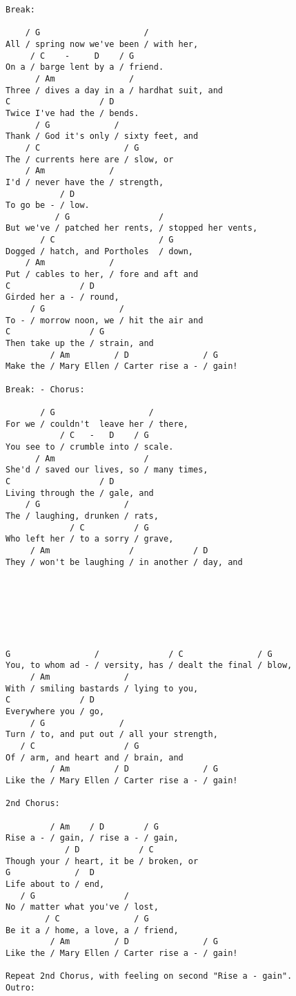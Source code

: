 \documentclass[leqno]{memoir}
\begin{document}
\begin{verbatim}
Break:

    / G                     /
All / spring now we've been / with her,
     / C    -     D    / G
On a / barge lent by a / friend.
      / Am               /
Three / dives a day in a / hardhat suit, and
C                  / D
Twice I've had the / bends.
      / G             /
Thank / God it's only / sixty feet, and
    / C                 / G
The / currents here are / slow, or
    / Am             /
I'd / never have the / strength,
           / D
To go be - / low.
          / G                  /
But we've / patched her rents, / stopped her vents,
       / C                     / G
Dogged / hatch, and Portholes  / down,
    / Am             /
Put / cables to her, / fore and aft and
C              / D
Girded her a - / round,
     / G               /
To - / morrow noon, we / hit the air and
C                / G
Then take up the / strain, and
         / Am         / D               / G
Make the / Mary Ellen / Carter rise a - / gain!

Break: - Chorus:

       / G                   /
For we / couldn't  leave her / there,
           / C   -   D    / G
You see to / crumble into / scale.
      / Am                  /
She'd / saved our lives, so / many times,
C                  / D
Living through the / gale, and
    / G                 /
The / laughing, drunken / rats,
             / C          / G
Who left her / to a sorry / grave,
     / Am                /            / D
They / won't be laughing / in another / day, and







G                 /              / C               / G
You, to whom ad - / versity, has / dealt the final / blow,
     / Am               /
With / smiling bastards / lying to you,
C              / D
Everywhere you / go,
     / G               /
Turn / to, and put out / all your strength,
   / C                  / G
Of / arm, and heart and / brain, and
         / Am         / D               / G
Like the / Mary Ellen / Carter rise a - / gain!

2nd Chorus:

         / Am    / D        / G
Rise a - / gain, / rise a - / gain,
            / D            / C
Though your / heart, it be / broken, or
G             /  D
Life about to / end,
   / G                  /
No / matter what you've / lost,
        / C               / G
Be it a / home, a love, a / friend,
         / Am         / D               / G
Like the / Mary Ellen / Carter rise a - / gain!

Repeat 2nd Chorus, with feeling on second "Rise a - gain".
Outro:
\end{verbatim}
\newpage
\end{document}
